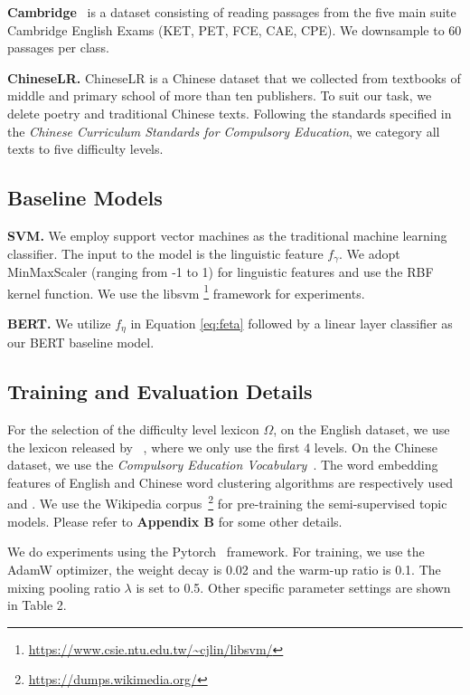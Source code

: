 \documentclass[11pt]{article}
\begin{document}
\textbf{Cambridge}~\cite{xia2019text} is a dataset consisting of reading passages from the five main suite Cambridge English Exams (KET, PET, FCE, CAE, CPE). 
We downsample to 60 passages per class.

\textbf{ChineseLR.} ChineseLR is a Chinese dataset that we collected from textbooks of middle and primary school of more than ten publishers. To suit our task, we delete poetry and traditional Chinese texts. Following the standards specified in the \textit{Chinese Curriculum Standards for Compulsory Education}, we category all texts to five difficulty levels.


\subsection{Baseline Models}

\textbf{SVM.} We employ support vector machines as the traditional machine learning classifier. The input to the model is the linguistic feature $f_\gamma$. We adopt MinMaxScaler (ranging from -1 to 1) for linguistic features and use the RBF kernel function. We use the libsvm \footnote{\url{https://www.csie.ntu.edu.tw/~cjlin/libsvm/}} framework for experiments. 

\noindent\textbf{BERT.} We utilize $f_{\eta}$ in Equation \ref{eq:feta} followed by a linear layer classifier as our BERT baseline model.



\subsection{Training and Evaluation Details}
For the selection of the difficulty level lexicon $\Omega$, on the English dataset, we use the lexicon released by ~\citet{maddela2018word}, where we only use the first 4 levels. On the Chinese dataset, we use the \textit{Compulsory Education Vocabulary}~\cite{Su2019CECV}. 
The word embedding features of English and Chinese word clustering algorithms are respectively used \cite{pennington2014glove} and \cite{song2018directional}. We use the Wikipedia corpus~\footnote{\url{https://dumps.wikimedia.org/}} for pre-training the semi-supervised topic models. 
Please refer to \textbf{Appendix B} for some other details.

We do experiments using the Pytorch~\cite{paszke2019pytorch} framework. For training, we use the AdamW optimizer, the weight decay is 0.02 and the warm-up ratio is 0.1.
The mixing pooling ratio $\lambda$ is set to 0.5.
Other specific parameter settings are shown in Table 2.
\end{document}
